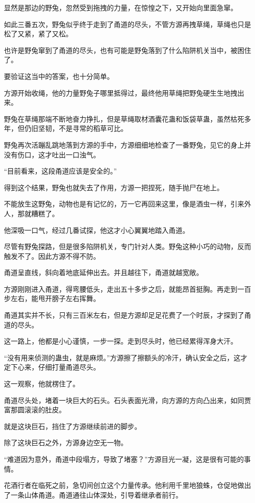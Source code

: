 \begin{this_body}
显然是那边的野兔，忽然受到拖拽的力量，在惊惶之下，又开始向里面急窜。

如此三番五次，野兔似乎终于走到了甬道的尽头，不管方源再拽草绳，草绳也只是松了又紧，紧了又松。

也许是野兔窜到了甬道的尽头，也有可能是野兔落到了什么陷阱机关当中，被困住了。

要验证这当中的答案，也十分简单。

方源开始收绳，他的力量野兔子哪里抵得过，最终他用草绳把野兔硬生生地拽出来。

野兔在草绳那端不断地奋力挣扎，但是草绳取材酒囊花蛊和饭袋草蛊，虽然枯死多年，但仍旧坚韧，不是寻常的稻草可比。

野兔再次活蹦乱跳地落到方源的手中，方源细细地检查了一番野兔，见它的身上并没有伤口，这才吐出一口浊气。

“目前看来，这段甬道应该是安全的。”

得到这个结果，野兔也就失去了作用，方源一把捏死，随手抛尸在地上。

不能放生这野兔，动物也是有记忆的，万一它再回来这里，像是酒虫一样，引来外人，那就糟糕了。

他深吸一口气，经过几番试探，他这才小心翼翼地踏入甬道。

尽管有野兔探路，但是很多陷阱机关，专门针对人类。野兔这种小巧的动物，反而触发不了。因此方源不得不防。

甬道呈直线，斜向着地底延伸出去。并且越往下，甬道就越宽敞。

方源刚刚进入甬道，得弯腰低头，走出五十多步之后，就能昂首挺胸。再走到一百步左右，能甩开膀子左右挥舞。

甬道其实并不长，只有三百米左右，但是方源却足足花费了一个时辰，才探到了甬道的尽头。

这一路上，他都是小心谨慎，一步一探。走到尽头时，他已经累得浑身大汗。

“没有用来侦测的蛊虫，就是麻烦。”方源擦了擦额头的冷汗，确认安全之后，这才定下心来，仔细打量甬道尽头。

这一观察，他就楞住了。

甬道尽头处，堵着一块巨大的石头。石头表面光滑，向方源的方向凸出来，如同贾富那圆滚滚的肚皮。

就是这块巨石，挡住了方源继续前进的脚步。

除了这块巨石之外，方源身边空无一物。

“难道因为意外，甬道中段塌方，导致了堵塞？”方源目光一凝，这是很有可能的事情。

花酒行者在临死之前，急切间创立这个力量传承。他利用千里地狼蛛，仓促地做出了一条山体甬道。甬道通往山体深处，引导着继承者前行。


\end{this_body}
